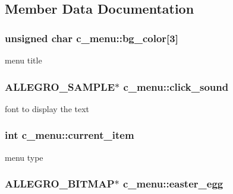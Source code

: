 \subsection{Member Data Documentation}
\hypertarget{classc__menu_a24f640c1886fdf22053a50f8700d559f}{
\subsubsection[{bg\-\_\-color}]{\setlength{\rightskip}{0pt plus 5cm}unsigned char c\-\_\-menu\-::bg\-\_\-color\mbox{[}3\mbox{]}\hspace{0.3cm}{\ttfamily [protected]}}}\label{classc__menu_a24f640c1886fdf22053a50f8700d559f}
menu title \hypertarget{classc__menu_a697e104d6bb5ac42a46a0a8076a82444}{
\subsubsection[{click\-\_\-sound}]{\setlength{\rightskip}{0pt plus 5cm}A\-L\-L\-E\-G\-R\-O\-\_\-\-S\-A\-M\-P\-L\-E$\ast$ c\-\_\-menu\-::click\-\_\-sound\hspace{0.3cm}{\ttfamily [protected]}}}\label{classc__menu_a697e104d6bb5ac42a46a0a8076a82444}
font to display the text \hypertarget{classc__menu_a5ccfb7e7c08dd3b70b7ddf5fd1f00308}{
\subsubsection[{current\-\_\-item}]{\setlength{\rightskip}{0pt plus 5cm}int c\-\_\-menu\-::current\-\_\-item\hspace{0.3cm}{\ttfamily [protected]}}}\label{classc__menu_a5ccfb7e7c08dd3b70b7ddf5fd1f00308}
menu type \hypertarget{classc__menu_a823fbb421af347ddd1c891fec53c242d}{
\subsubsection[{easter\-\_\-egg}]{\setlength{\rightskip}{0pt plus 5cm}A\-L\-L\-E\-G\-R\-O\-\_\-\-B\-I\-T\-M\-A\-P$\ast$ c\-\_\-menu\-::easter\-\_\-egg\hspace{0.3cm}{\ttfamily [protected]}}}\label{classc__menu_a823fbb421af347ddd1c891fec53c242d}

